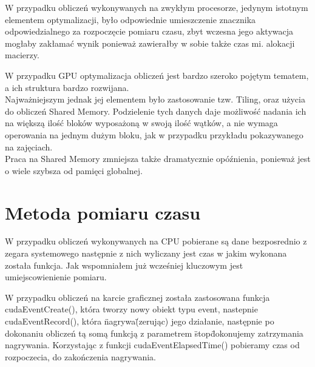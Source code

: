 \documentclass[a4paper,12pt,oneside]{article}
\begin{document}
W przypadku obliczeń wykonywanych  na zwykłym procesorze, jedynym istotnym elementem optymalizacji, było odpowiednie umieszczenie znacznika 
odpowiedzialnego za rozpoczęcie pomiaru czasu, zbyt wczesna jego aktywacja mogłaby zakłamać wynik ponieważ zawierałby w sobie także czas
mi. alokacji macierzy.

W przypadku GPU optymalizacja obliczeń jest bardzo szeroko pojętym tematem, a ich struktura bardzo rozwijana. \\
Najważniejszym jednak jej elementem było zastosowanie tzw. Tiling, oraz użycia do obliczeń Shared Memory.
Podzielenie tych danych daje możliwość nadania ich na większą ilość bloków wyposażoną w swoją ilość wątków,
a nie wymaga operowania na jednym dużym bloku, jak w przypadku przykładu pokazywanego na zajęciach. \\
Praca na Shared Memory zmniejsza także dramatycznie opóźnienia, ponieważ jest o wiele szybsza od pamięci globalnej.


\section{Metoda pomiaru czasu}

W przypadku obliczeń wykonywanych na CPU pobierane są dane bezposrednio z zegara systemowego następnie z nich wyliczany jest czas w jakim wykonana została funkcja. Jak wspomniałem już wcześniej kluczowym jest umiejscowienienie pomiaru.


W przypadku obliczeń na karcie graficznej została zastosowana funkcja cudaEventCreate(), która tworzy nowy obiekt typu event, nastepnie cudaEventRecord(), która \"nagrywa\" (zerując) jego działanie, następnie po dokonaniu obliczeń tą somą funkcją z parametrem \"stop\" dokonujemy zatrzymania nagrywania. Korzystając z funkcji cudaEventElapsedTime() pobieramy czas od rozpoczecia, do zakończenia nagrywania.
\end{document}
